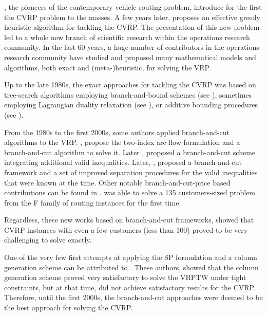 \textcite{dantzig1959},
the pioneers of the contemporary vehicle routing problem,
introduce for the first the CVRP problem to the masses.
A few years later, \textcite{clarke1964} proposes
an effective greedy heuristic algorithm for tackling the CVRP.
The presentation of this new problem led to a whole new branch
of scientific research within the operations research community.
In the last 60 years, a huge number of contributors in
the operations research community have studied and proposed many
mathematical models and algorithms, both exact and (meta-)heuristic,
for solving the VRP.

Up to the late 1980s, the exact approaches for tackling the CVRP was
based on tree-search algorithms employing branch-and-bound schemes
(see \textcite{pierce1969, christofides1969, christofides1981, laporte1986}),
sometimes employing Lagrangian duality relaxation (see \textcite{fisher1994, miller1995}),
or additive bounding procedures (see \textcite{fischetti1994a, hadjiconstantinou1995}).

From the 1980s to the first 2000s, some authors applied branch-and-cut
algorithms to the VRP.
\textcite{laporte1983, laporte1985}, propose the two-index arc flow formulation
and a branch-and-cut algorithm to solve it.
Later \textcite{augerat1995approche}, proposed a branch-and-cut scheme
integrating additional valid inequalities.
Later, \textcite{lysgaard2004},
proposed a branch-and-cut framework and
a set of improved separation procedures for
the valid inequalities that were known at the time.
Other notable branch-and-cut-price based contributions
can be found in \textcite{araqueg1994, augerat1995, achuthan1996, blasum2000, ralphs2003, achuthan2003, baldacci2004}.
\citeauthor{baldacci2004} was able to solve a
135 customers-sized problem from the F family of routing instances \textcite{fisher1994}
for the first time.

Regardless, these new works based on branch-and-cut frameworks, showed that CVRP instances
with even a few customers (less than 100) proved
to be very challenging to solve exactly.


One of the very few first attempts at applying
the SP formulation and a column generation scheme can
be attributed to \textcite{desrosiers1984, agarwal1989setpartitioningbased}.
These authors, showed that the column generation scheme proved
very satisfactory to solve the VRPTW under tight constraints,
but at that time, did not achieve satisfactory results for the CVRP.
Therefore, until the first 2000s, the branch-and-cut approaches
were deemed to be the best approach for solving the CVRP.

